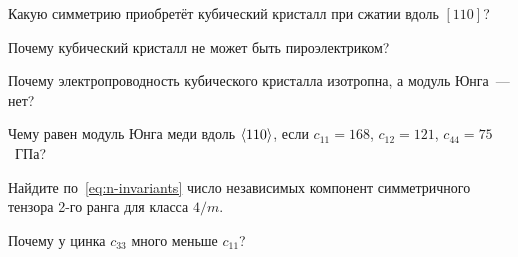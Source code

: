 \begin{proverka}
\item Какую симметрию приобретёт кубический кристалл при сжатии вдоль
$[110]$?
\item Почему кубический кристалл не может быть пироэлектриком?
\item Почему электропроводность кубического кристалла изотропна, а
модуль Юнга~— нет?
\item Чему равен модуль Юнга меди вдоль $\langle 110\rangle$, если
$c_{11}=168$, $c_{12}=121$, $c_{44}=75$~ГПа?
\item Найдите по~\eqref{eq:n-invariants} число независимых компонент
симметричного тензора 2-го ранга для класса $4/m$.
\item Почему у цинка $c_{33}$ много меньше $c_{11}$?
\end{proverka}
